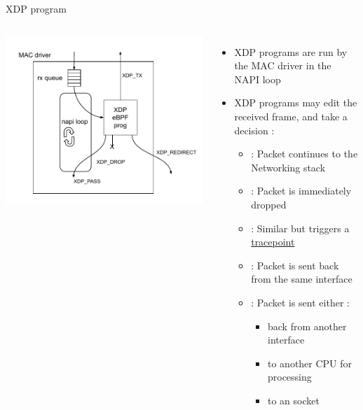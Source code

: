 \begin{frame}{XDP program}
	\begin{columns}
		\includegraphics[width=1.4\textwidth]{slides/networking-ebpf-xdp/xdp.pdf}
	\begin{itemize}
		\item XDP programs are run by the MAC driver in the NAPI loop
		\item XDP programs may edit the received frame, and take a decision :
			\begin{itemize}
				\item {} : Packet continues to the Networking stack
				\item {} : Packet is immediately dropped
				\item {} : Similar  but triggers a \href{https://elixir.bootlin.com/linux/v6.12.32/A/ident/xdp_exception}{tracepoint}
				\item {} : Packet is sent back from the same interface
				\item {} : Packet is sent either :
					\begin{itemize}
						\item back from another interface
						\item to another CPU for processing
						\item to an  socket
					\end{itemize}
			\end{itemize}
	\end{itemize}
	\end{columns}
\end{frame}


